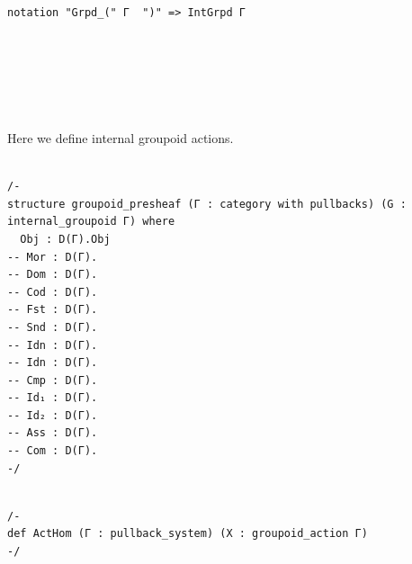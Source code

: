 \documentclass{book}
\theoremstyle{definition}
\newcounter{pcounter}
\newcounter{lcounter}
\newcounter{sectioncount}
\newcounter{subsectioncount}
\renewcommand{\section}[1]{\newpage\ \\ \ \\ \begin{center} \scalebox{1.5}{\texttt{\thesectioncount . #1}} \stepcounter{sectioncount} \setcounter{subsectioncount}{1} \end{center} \begin{center} \ \\ \ \\ \thispagestyle{empty} \end{center}}
\begin{document}
{\begin{center}
\begin{tcolorbox}[width=5in,colback={white},title={\begin{center}\texttt{Lean \thelcounter} \addtocounter{lcounter}{1}  \end{center}},colbacktitle=Green,coltitle=black]
\begin{verbatim}
notation "Grpd_(" Γ  ")" => IntGrpd Γ

\end{verbatim}
\end{tcolorbox}
\end{center}

\section{\texttt{IntAct}}

Here we define internal groupoid actions.\\

\begin{center}
\begin{tcolorbox}[width=5in,colback={white},title={\begin{center}\texttt{Lean \thelcounter} \addtocounter{lcounter}{1}  \end{center}},colbacktitle=Blue,coltitle=black]
\begin{verbatim}

/-
structure groupoid_presheaf (Γ : category with pullbacks) (G : internal_groupoid Γ) where
  Obj : D(Γ).Obj
-- Mor : D(Γ).
-- Dom : D(Γ).
-- Cod : D(Γ).
-- Fst : D(Γ).
-- Snd : D(Γ).
-- Idn : D(Γ). 
-- Idn : D(Γ).
-- Cmp : D(Γ).
-- Id₁ : D(Γ).
-- Id₂ : D(Γ).
-- Ass : D(Γ).
-- Com : D(Γ).
-/

\end{verbatim}
\end{tcolorbox}
\end{center}

\begin{center}
\begin{tcolorbox}[width=5in,colback={white},title={\begin{center}\texttt{Lean \thelcounter} \addtocounter{lcounter}{1}  \end{center}},colbacktitle=Blue,coltitle=black]
\begin{verbatim}

/-
def ActHom (Γ : pullback_system) (X : groupoid_action Γ)
-/

\end{verbatim}
\end{tcolorbox}
\end{center}

\begin{center}
\begin{tcolorbox}[width=5in,colback={white},title={\begin{center}\texttt{Lean \thelcounter} \addtocounter{lcounter}{1}  \end{center}},colbacktitle=Blue,coltitle=black]
\begin{verbatim}


\end{verbatim}
\end{tcolorbox}
\end{center}}
\end{document}
